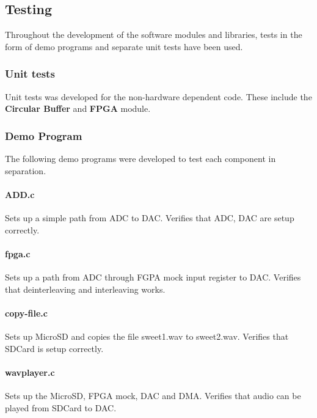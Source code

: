 \subsection{Testing}

Throughout the development of the software modules and libraries, tests in the form
of demo programs and separate unit tests have been used.

\subsubsection{Unit tests}

Unit tests was developed for the non-hardware dependent code. These include the
{\bf Circular Buffer} and {\bf FPGA} module.

\subsubsection{Demo Program}
The following demo programs were developed to test each component in separation.


\paragraph{ADD.c}
Sets up a simple path from ADC to DAC.
Verifies that ADC, DAC are setup correctly.

\paragraph{fpga.c}
Sets up a path from ADC through FGPA mock input register to DAC.
Verifies that deinterleaving and interleaving works.

\paragraph{copy-file.c}
Sets up MicroSD and copies the file sweet1.wav to sweet2.wav.
Verifies that SDCard is setup correctly.

\paragraph{wavplayer.c}
Sets up the MicroSD, FPGA mock, DAC and DMA.
Verifies that audio can be played from SDCard to DAC.
